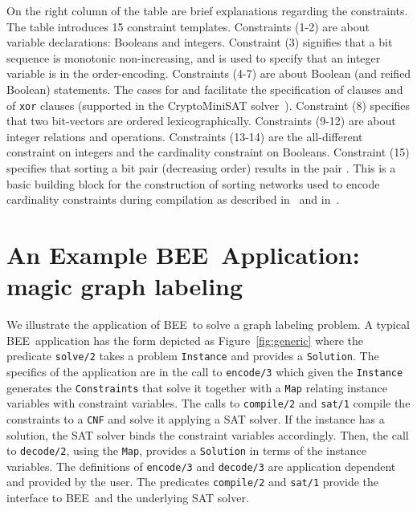 \documentclass{tlp}
\newcommand{\bee}{\textsf{BEE}}
\begin{document}
On the right column of the table are brief explanations regarding the
constraints. The table introduces 15 constraint templates.
Constraints (1-2) are about variable declarations: Booleans and
integers. Constraint (3) signifies that a bit sequence is monotonic
non-increasing, and is used to specify that an integer variable is in
the order-encoding.
Constraints (4-7) are about Boolean (and reified Boolean)
statements. The cases for 
and  facilitate the
specification of clauses and of \texttt{xor} clauses (supported in the
CryptoMiniSAT solver~\cite{Crypto}).
Constraint (8) specifies that two bit-vectors are ordered
lexicographically. 
Constraints (9-12) are about integer relations and operations.
Constraints (13-14) are the all-different constraint on integers and
the cardinality constraint on Booleans.  Constraint (15) specifies
that sorting a bit pair  (decreasing order)
results in the pair . This is a basic building
block for the construction of sorting networks \cite{Batcher68} used
to encode cardinality constraints during compilation as described
in~\cite{AsinNOR11} and in~\cite{DBLP:conf/lpar/CodishZ10}.




\section{An Example \bee\ Application: magic graph labeling}
\label{sec:magic}

We illustrate the application of \bee\ to solve a
graph labeling problem.
A typical \bee\ application has the form depicted as
Figure~\ref{fig:generic} where the predicate \texttt{solve/2} takes a
problem \texttt{Instance} and provides a \texttt{Solution}. The
specifics of the application are in the call to \texttt{encode/3}
which given the \texttt{Instance} generates the \texttt{Constraints}
that solve it together with a \texttt{Map} relating instance variables with
constraint variables.  The calls to \texttt{compile/2} and 
\texttt{sat/1} compile the constraints to a \texttt{CNF} and solve it
applying a SAT solver. If the instance has a solution, the SAT solver
binds the constraint variables accordingly. Then, the call to
\texttt{decode/2}, using the \texttt{Map}, provides a
\texttt{Solution} in terms of the instance variables.
The definitions of \texttt{encode/3} and \texttt{decode/3} are
application dependent and provided by the user. The predicates
\texttt{compile/2} and \texttt{sat/1} provide the interface to \bee\
and the underlying SAT solver.
\end{document}
